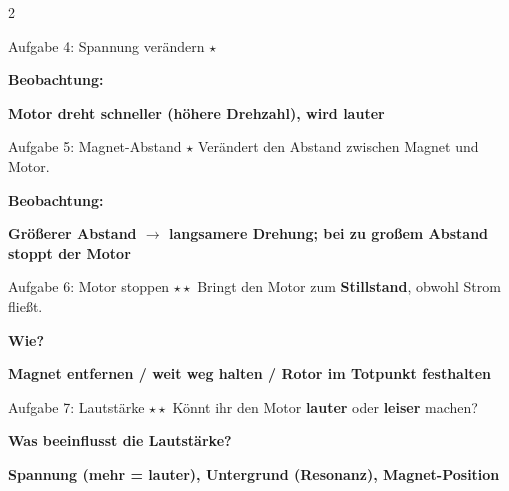 \documentclass[10pt, a4paper]{article}
\newcommand{\lsg}[1]{\textcolor{loesung}{\textbf{#1}}}
\newcommand{\sternI}{$\star$}
\newcommand{\sternII}{$\star\star$}
\begin{document}
\begin{multicols}{2}
\begin{aufgabenbox}{Aufgabe 4: Spannung verändern \hfill \sternI}
\begin{loesungbox}
\textbf{Beobachtung:}

\lsg{Motor dreht schneller (höhere Drehzahl), wird lauter}
\end{loesungbox}
\end{aufgabenbox}

\begin{aufgabenbox}{Aufgabe 5: Magnet-Abstand \hfill \sternI}
\small
Verändert den Abstand zwischen Magnet und Motor.

\begin{loesungbox}
\textbf{Beobachtung:}

\lsg{Größerer Abstand $\rightarrow$ langsamere Drehung; bei zu großem Abstand stoppt der Motor}
\end{loesungbox}
\end{aufgabenbox}

\begin{aufgabenbox}{Aufgabe 6: Motor stoppen \hfill \sternII}
\small
Bringt den Motor zum \textbf{Stillstand}, obwohl Strom fließt.

\begin{loesungbox}
\textbf{Wie?}

\lsg{Magnet entfernen / weit weg halten / Rotor im Totpunkt festhalten}
\end{loesungbox}
\end{aufgabenbox}

\begin{aufgabenbox}{Aufgabe 7: Lautstärke \hfill \sternII}
\small
Könnt ihr den Motor \textbf{lauter} oder \textbf{leiser} machen?

\begin{loesungbox}
\textbf{Was beeinflusst die Lautstärke?}

\lsg{Spannung (mehr = lauter), Untergrund (Resonanz), Magnet-Position}
\end{loesungbox}
\end{aufgabenbox}

\end{multicols}

\end{document}
